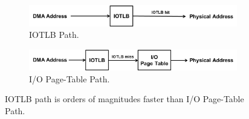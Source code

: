 \begin{figure}[!t]
    \begin{subfigure}{0.5\textwidth}

        \includegraphics[width=1\textwidth]{image/background/DMA-IOTLB-translation.png}

        \caption{\centering IOTLB Path.}
        \label{fig:subfig:a}
    \end{subfigure}%
    \vfill
    \vfill
    \vfill
    \vfill
    \begin{subfigure}{0.5\textwidth}

        \includegraphics[width=1\textwidth]{image/background/DMA-pt-translation.png}

        \caption{\centering I/O Page-Table Path.}
        \label{fig:subfig:b}
    \end{subfigure}
    \caption{IOTLB path is orders of magnitudes faster than I/O Page-Table Path.}
    \label{fig:dma-add-trans}
\end{figure}



